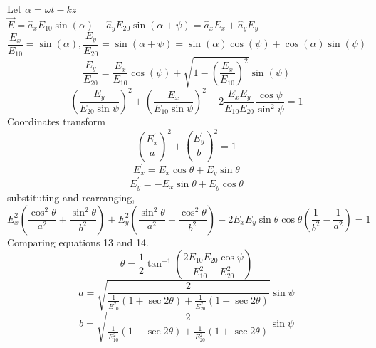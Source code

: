 \documentclass[a4paper]{article}
\begin{document}
    \begin{answer}[Question 6]
        Let \(\alpha = \omega t - k z\) \\
        \(\vec{E} = \hat{a}_x E_{10}\sin(\alpha) + \hat{a}_y E_{20} \sin(\alpha + \psi)  = \hat{a}_x E_x + \hat{a}_y E_y\) 
        \[
            \frac{E_x}{E_{10} } = \sin(\alpha) , \frac{E_y}{E_{20} } = \sin (\alpha + \psi) = \sin (\alpha)\cos (\psi) + \cos (\alpha)\sin (\psi)
        \]
        \[
            \frac{E_{y} }{E_{20} } = \frac{E_x}{E_{10} }\cos (\psi) + \sqrt{1-\left(\frac{E_x}{E_{10} }\right)^2} \sin (\psi)
        \]
        \begin{equation}
            \left(\frac{E_{y} }{E_{20} \sin \psi }\right)^2 + \left(\frac{E_{x} }{E_{10} \sin \psi }\right)^2 - 2 \frac{E_x E_y}{E_{10}E_{20}  }\frac{\cos \psi}{\sin ^2 \psi}=1
        \end{equation}
        Coordinates transform 
        \[
            \left(\frac{E_x^\prime }{a}  \right)^2 + \left(\frac{E_y^\prime }{b}  \right)^2 = 1
        \]
        \[
            E_{x} ^\prime  = E _{x} \cos \theta + E_{y} \sin \theta
        \]
        \[
            E_{y} ^\prime = -E_{x} \sin \theta + E_{y} \cos\theta
        \]
        substituting and rearranging,
        \begin{equation}
            E_{x}^{2}\left(\frac{\cos ^2 \theta}{a^2}+\frac{\sin ^2 \theta}{b^2}\right) + E_{y}^{2}\left(\frac{\sin ^2 \theta}{a^2}+\frac{\cos ^2 \theta}{b^2}\right) - 2 E_{x} E_{y} \sin \theta \cos \theta (\frac{1}{b^2}-\frac{1}{a^2}) = 1
        \end{equation}
        Comparing equations 13 and 14. 
        \[
            \theta = \frac{1}{2}\tan^{-1}(\frac{2 E_{10}E_{20}\cos \psi  }{E_{10}^2 - E_{20}^2 } ) 
        \]
        \[
            a = \sqrt{\frac{2}{\frac{1}{E_{10}^{2}  }(1+\sec 2\theta)+\frac{1}{E_{20}^2 }(1-\sec 2\theta)}} \sin \psi
        \]
        \[
            b = \sqrt{\frac{2}{\frac{1}{E_{10}^{2}  }(1-\sec 2\theta)+\frac{1}{E_{20}^2 }(1+\sec 2\theta)}} \sin \psi
        \]

    \end{answer}
\end{document}
